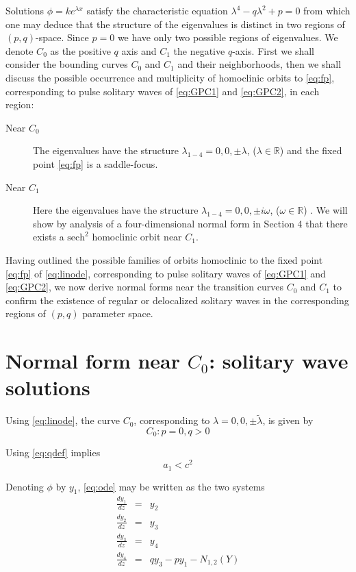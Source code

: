 Solutions $\phi = k e^{\lambda x}$ satisfy the characteristic equation
$\lambda^4 - q \lambda^2 + p = 0 $ from which one may deduce that the structure
of the eigenvalues is distinct in two regions of $\left(p,q\right)$-space.
Since $p=0$ we have only two possible regions of eigenvalues.  We denote $C_0$
as the positive $q$ axis and $C_1$ the negative $q$-axis. First we shall 
consider the bounding curves $C_0$ and $C_1$ and their neighborhoods, then we shall discuss the possible
occurrence and multiplicity of homoclinic orbits to \eqref{eq:fp}, corresponding
to pulse solitary waves of \eqref{eq:GPC1} and \eqref{eq:GPC2}, in each region:

\begin{description}
\item[Near $C_0$] 
The eigenvalues have the structure $\lambda_{1-4} = 0,0,\pm \lambda$, ($\lambda \in \mathbb{R}$) and the fixed point
\eqref{eq:fp} is a saddle-focus.
\item[Near $C_1$] 
Here the eigenvalues have the structure $\lambda_{1-4} = 0,0,\pm i \omega $, ($\omega \in \mathbb{R}$) . We will show by analysis of a
four-dimensional normal form in Section 4 that there exists a $\mathrm{sech}^2$ homoclinic orbit near $C_1$.
\end{description}

Having outlined the possible families of orbits homoclinic to the fixed point \eqref{eq:fp} of \eqref{eq:linode},
corresponding to pulse solitary waves of \eqref{eq:GPC1} and \eqref{eq:GPC2}, we now derive normal forms near the transition curves $C_0$ and $C_1$
to confirm the existence of regular or delocalized solitary waves in the corresponding regions of $\left(p,q\right)$ parameter space.


\section{Normal form near $C_0$: solitary wave solutions}

Using \eqref{eq:linode}, the curve $C_0$, corresponding to $\lambda = 0,0,\pm \tilde{ \lambda } $, is given by
\begin{equation}
C_0: { p=0, q > 0 }
\end{equation}

Using \eqref{eq:qdef} implies
\begin{equation}
a_1 < c^2 
\end{equation}

Denoting $\phi$ by $y_1$, \eqref{eq:ode} may be written as the two systems
\begin{subequations}\label{eq:system}
\begin{eqnarray}
\frac{d y_1 }{d z} &=& y_2 \\
\frac{d y_2 }{d z} &=& y_3 \\
\frac{d y_3 }{d z} &=& y_4 \\
\frac{d y_4 }{d z} &=& q y_3 - p y_1 - N_{1,2}(Y)
\end{eqnarray}
\end{subequations}


